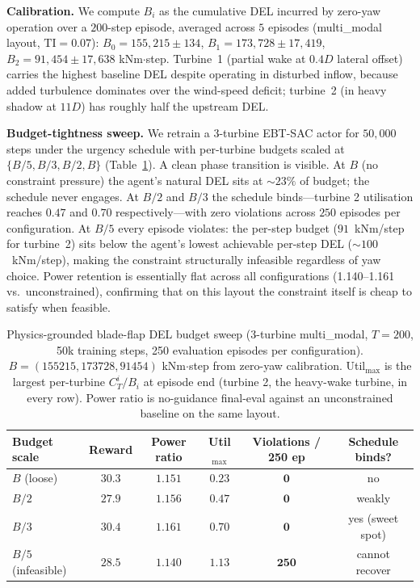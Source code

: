 \textbf{Calibration.}
We compute $B_i$ as the cumulative DEL incurred by zero-yaw operation over a $200$-step episode, averaged across $5$ episodes (multi\_modal layout, $\mathrm{TI}\!=\!0.07$):
$B_0\!=\!155{,}215\!\pm\!134$, $B_1\!=\!173{,}728\!\pm\!17{,}419$, $B_2\!=\!91{,}454\!\pm\!17{,}638$ kNm$\cdot$step.
Turbine~1 (partial wake at $0.4D$ lateral offset) carries the highest baseline DEL despite operating in disturbed inflow, because added turbulence dominates over the wind-speed deficit; turbine~2 (in heavy shadow at $11D$) has roughly half the upstream DEL.

\textbf{Budget-tightness sweep.}
We retrain a 3-turbine EBT-SAC actor for $50{,}000$ steps under the urgency schedule with per-turbine budgets scaled at $\{B/5, B/3, B/2, B\}$ (Table~\ref{tab:flap_del_sweep}).
A clean phase transition is visible.
At $B$ (no constraint pressure) the agent's natural DEL sits at $\sim\!23\%$ of budget; the schedule never engages.
At $B/2$ and $B/3$ the schedule binds---turbine 2 utilisation reaches $0.47$ and $0.70$ respectively---with zero violations across $250$ episodes per configuration.
At $B/5$ every episode violates: the per-step budget ($91$~kNm/step for turbine~2) sits below the agent's lowest achievable per-step DEL ($\sim\!100$~kNm/step), making the constraint structurally infeasible regardless of yaw choice.
Power retention is essentially flat across all configurations (1.140--1.161 vs.\ unconstrained), confirming that on this layout the constraint itself is cheap to satisfy when feasible.

\begin{table}[h]
\centering
\caption{Physics-grounded blade-flap DEL budget sweep (3-turbine multi\_modal, $T\!=\!200$, 50k training steps, 250 evaluation episodes per configuration). $B = (155215, 173728, 91454)$ kNm$\cdot$step from zero-yaw calibration. Util$_{\mathrm{max}}$ is the largest per-turbine $C_T^i / B_i$ at episode end (turbine 2, the heavy-wake turbine, in every row). Power ratio is no-guidance final-eval against an unconstrained baseline on the same layout.}
\label{tab:flap_del_sweep}
\begin{tabular}{lccccc}
\toprule
Budget scale & Reward & Power ratio & Util$_{\mathrm{max}}$ & Violations / 250 ep & Schedule binds? \\
\midrule
$B$ \quad(loose)   & $30.3$ & $1.151$ & $0.23$ & $\mathbf{0}$ & no \\
$B/2$              & $27.9$ & $1.156$ & $0.47$ & $\mathbf{0}$ & weakly \\
$B/3$              & $\mathbf{30.4}$ & $\mathbf{1.161}$ & $0.70$ & $\mathbf{0}$ & yes (sweet spot) \\
$B/5$ \quad(infeasible) & $28.5$ & $1.140$ & $\mathbf{1.13}$ & $\mathbf{250}$ & cannot recover \\
\bottomrule
\end{tabular}
\end{table}

